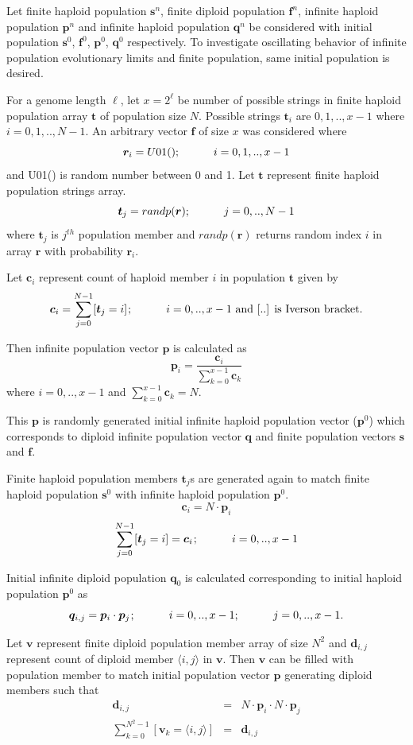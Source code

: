 Let finite haploid population $\bm{s}^n$, finite diploid population $\bm{f}^n$, infinite haploid population $\bm{p}^n$ 
and infinite haploid population $\bm{q}^n$ be considered with initial population $\bm{s}^0$, $\bm{f}^0$,
$\bm{p}^0$, $\bm{q}^0$ respectively. To investigate oscillating behavior of infinite population evolutionary limits 
and finite population, same initial population is desired. 

For a genome length $\ell$, let $x = 2^\ell$ be number of possible strings in finite haploid population array $\bm{t}$ of 
population size $N$. Possible strings $\bm{t}_i$ are ${0, 1,.., x-1}$ where $i = 0, 1,.., N-1$. An arbitrary vector $\bm{f}$ of size $x$ 
was considered where
\[
\bm{r}_i = U01(); \hspace{30pt} {i = 0, 1,.., x-1}
\]
and U01() is random number between 0 and 1.
Let $\bm{t}$ represent finite haploid population strings array.
\[
\bm{t}_j = randp(\bm{r}) ; \hspace{30pt} {j = 0,.., N-1}
\]
where $\bm{t}_j$ is $j^{th}$ population member and $randp(\bm{r})$ returns random index $i$ in array $\bm{r}$ with probability $\bm{r}_i$.

Let $\bm{c}_i$ represent count of haploid member $i$ in population $\bm{t}$ given by
\[
\bm{c}_i = \sum \limits_{j=0}^{N-1} [\bm{t}_j = i]  \hspace{0.01in}; \hspace{30pt}  {i = 0,.., x-1} \text{ and  [..]  is  Iverson bracket.}
\]

Then infinite population vector $\bm{p}$ is calculated as
\[
\bm{p}_i = \frac{\bm{c}_i}{ \sum \limits_{k=0}^{x-1} \bm{c}_k }
\]
where $i = 0,.., x-1$ and $\sum \limits_{k=0}^{x-1} \bm{c}_k = N$.

This $\bm{p}$ is randomly generated initial infinite haploid population vector ($\bm{p}^0$) which corresponds to diploid infinite population vector $\bm{q}$ 
and finite population vectors $\bm{s}$ and $\bm{f}$.

Finite haploid population members $\bm{t}_j$s are generated again to match finite haploid population $\bm{s}^0$ with infinite haploid population $\bm{p}^0$.
\[
\bm{c}_i = N \cdot \bm{p}_i 
\]
\[
\sum \limits_{j=0}^{N-1} [\bm{t}_j = i] = \bm{c}_i  \hspace{0.01in}; \hspace{30pt}  {i = 0,.., x-1} 
\]

Initial infinite diploid population $\bm{q}_0$ is calculated corresponding to initial haploid population $\bm{p}^0$ as
\[
\bm{q}_{i,j} = \bm{p}_i \cdot \bm{p}_j  \hspace{0.01in}; \hspace{30pt}  {i = 0,..,x-1; \hspace{30pt}j = 0,..,x-1}.
\]

Let $\bm{v}$ represent finite diploid population member array of size $N^2$ and $\bm{d}_{i,j}$ represent count of 
diploid member $\langle i,j \rangle$ in $\bm{v}$. Then $\bm{v}$ can be filled with population member to match 
initial population vector $\bm{p}$ generating diploid members such that
\begin{eqnarray*}
\bm{d}_{i,j} & = & N \cdot \bm{p}_i \cdot N \cdot \bm{p}_j  \\
\sum \limits_{k=0}^{N^2-1} [ \bm{v}_k = \langle i,j \rangle ] & = & \bm{d}_{i,j}
\end{eqnarray*}

